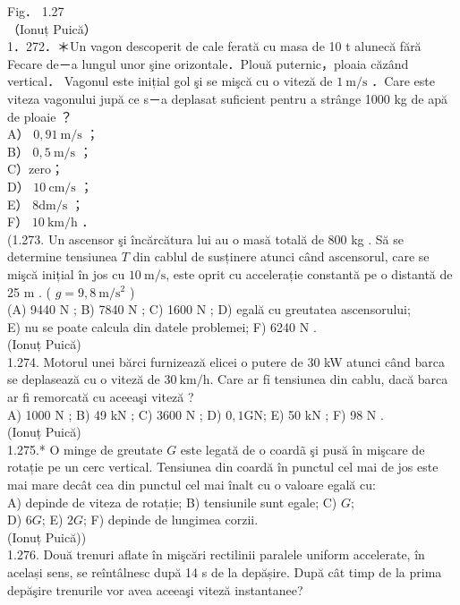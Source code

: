 {Fig． 1.27\\
（Ionuț Puică）\\
1．272．＊Un vagon descoperit de cale ferată cu masa de 10 t alunecă fără Fecare de－a lungul unor şine orizontale．Plouă puternic，ploaia căzând vertical． Vagonul este inițial gol şi se mişcă cu o viteză de $1 \mathrm{~m} / \mathrm{s}$ ．Care este viteza vagonului jupă ce s－a deplasat suficient pentru a strânge 1000 kg de apă de ploaie ？\\
A） $0,91 \mathrm{~m} / \mathrm{s}$ ；\\
B） $0,5 \mathrm{~m} / \mathrm{s}$ ；\\
C）zero；\\
D） $10 \mathrm{~cm} / \mathrm{s}$ ；\\
E） $8 \mathrm{dm} / \mathrm{s}$ ；\\
F） $10 \mathrm{~km} / \mathrm{h}$ ．\\
(1.273. Un ascensor şi încărcătura lui au o masă totală de 800 kg . Să se determine tensiunea $T$ din cablul de susținere atunci când ascensorul, care se mişcă inițial în jos cu $10 \mathrm{~m} / \mathrm{s}$, este oprit cu accelerație constantă pe o distantă de 25 m . ( $g=9,8 \mathrm{~m} / \mathrm{s}^{2}$ )\\
(A) 9440 N ; B) 7840 N ; C) 1600 N ; D) egală cu greutatea ascensorului;\\
E) nu se poate calcula din datele problemei; F) 6240 N .\\
(Ionuț Puică)\\
1.274. Motorul unei bărci furnizează elicei o putere de 30 kW atunci când barca se deplasează cu o viteză de $30 \mathrm{~km} / \mathrm{h}$. Care ar fỉ tensiunea din cablu, dacă barca ar fi remorcată cu aceeaşi viteză ?\\
A) 1000 N ; B) 49 kN ; C) 3600 N ; D) $0,1 \mathrm{GN}$; E) 50 kN ; F) 98 N .\\
(Ionuț Puică)\\
1.275.* O minge de greutate $G$ este legată de o coardã şi pusă în mişcare de rotație pe un cerc vertical. Tensiunea din coardă în punctul cel mai de jos este mai mare decât cea din punctul cel mai înalt cu o valoare egală cu:\\
A) depinde de viteza de rotație; B) tensiunile sunt egale; C) $G$;\\
D) $6 G$; E) $2 G$; F) depinde de lungimea corzii.\\
(Ionuț Puică))\\
1.276. Două trenuri aflate în mişcări rectilinii paralele uniform accelerate, în același sens, se reîntâlnesc după 14 s de la depășire. După cât timp de la prima depăşire trenurile vor avea aceeaşi viteză instantanee?\\
}
